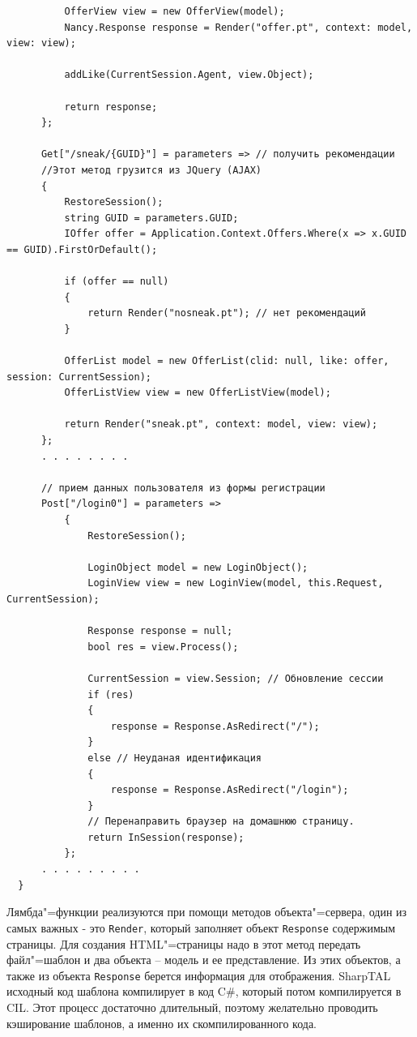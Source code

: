 \documentclass[a4paper,14pt,openany,final]{extreport} %
\begin{document}
{\begin{verbatim}
          OfferView view = new OfferView(model);
          Nancy.Response response = Render("offer.pt", context: model, view: view);

          addLike(CurrentSession.Agent, view.Object);

          return response;
      };

      Get["/sneak/{GUID}"] = parameters => // получить рекомендации
      //Этот метод грузится из JQuery (AJAX)
      {
          RestoreSession();
          string GUID = parameters.GUID;
          IOffer offer = Application.Context.Offers.Where(x => x.GUID == GUID).FirstOrDefault();

          if (offer == null)
          {
              return Render("nosneak.pt"); // нет рекомендаций
          }

          OfferList model = new OfferList(clid: null, like: offer, session: CurrentSession);
          OfferListView view = new OfferListView(model);

          return Render("sneak.pt", context: model, view: view);
      };
      . . . . . . . .

      // прием данных пользователя из формы регистрации
      Post["/login0"] = parameters =>
          {
              RestoreSession();

              LoginObject model = new LoginObject();
              LoginView view = new LoginView(model, this.Request, CurrentSession);

              Response response = null;
              bool res = view.Process();

              CurrentSession = view.Session; // Обновление сессии
              if (res)
              {
                  response = Response.AsRedirect("/");
              }
              else // Неуданая идентификация
              {
                  response = Response.AsRedirect("/login");
              }
              // Перенаправить браузер на домашнюю страницу.
              return InSession(response);
          };
      . . . . . . . . .
  }
\end{verbatim}

Лямбда"=функции реализуются при помощи методов объекта"=сервера, один из самых важных - это \verb|Render|, который заполняет объект \verb|Response| содержимым страницы. Для создания HTML"=страницы надо в этот метод передать файл"=шаблон и два объекта -- модель и ее представление. Из этих объектов, а также из объекта \verb|Response| берется информация для отображения. SharpTAL исходный код шаблона компилирует в код C\#, который потом компилируется в CIL. Этот процесс достаточно длительный, поэтому желательно проводить кэширование шаблонов, а именно их скомпилированного кода.

}
\end{document}
